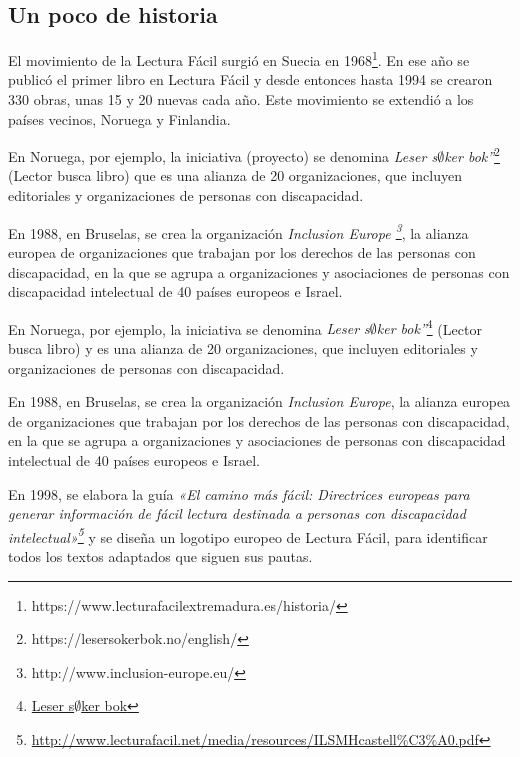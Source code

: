 \subsection{Un poco de historia}
El movimiento de la Lectura Fácil surgió en Suecia en 1968\footnote{https://www.lecturafacilextremadura.es/historia/}. En ese año se publicó el primer libro en Lectura Fácil y desde entonces hasta 1994 se crearon 330 obras, unas 15 y 20 nuevas cada año. Este movimiento se extendió a los países vecinos, Noruega y Finlandia.

 \setlength{\parskip}{10pt}
 
En Noruega, por ejemplo, la iniciativa (proyecto) se denomina \textit{Leser s$\emptyset$ker bok”}\footnote{https://lesersokerbok.no/english/} (Lector busca libro) que es una alianza de 20 organizaciones, que incluyen editoriales y organizaciones de personas con discapacidad.

 \setlength{\parskip}{10pt}
 
En 1988, en Bruselas, se crea la organización \textit{Inclusion Europe \footnote{http://www.inclusion-europe.eu/}}, la alianza europea de organizaciones que trabajan por los derechos de las personas con discapacidad, en la que se agrupa a organizaciones y asociaciones de personas con discapacidad intelectual de 40 países europeos e Israel.

 \setlength{\parskip}{10pt}

 \setlength{\parskip}{10pt}
 
En Noruega, por ejemplo, la iniciativa se denomina \textit{Leser s$\emptyset$ker bok”}\footnote{\href{https://lesersokerbok.no/english/}{Leser s$\emptyset$ker bok}} (Lector busca libro) y es una alianza de 20 organizaciones, que incluyen editoriales y organizaciones de personas con discapacidad.

 \setlength{\parskip}{10pt}
 
En 1988, en Bruselas, se crea la organización \textit{Inclusion Europe}, la alianza europea de organizaciones que trabajan por los derechos de las personas con discapacidad, en la que se agrupa a organizaciones y asociaciones de personas con discapacidad intelectual de 40 países europeos e Israel.


 \setlength{\parskip}{10pt}

En 1998, se elabora la guía \textit{«El camino más fácil: Directrices europeas para generar información de fácil lectura destinada a personas con discapacidad intelectual»\footnote{\href{http://www.lecturafacil.net/media/resources/ILSMHcastell\%C3\%A0.pdf}{http://www.lecturafacil.net/media/resources/ILSMHcastell\%C3\%A0.pdf}}} y se diseña un logotipo europeo de Lectura Fácil, para identificar todos los textos adaptados que siguen sus pautas.

